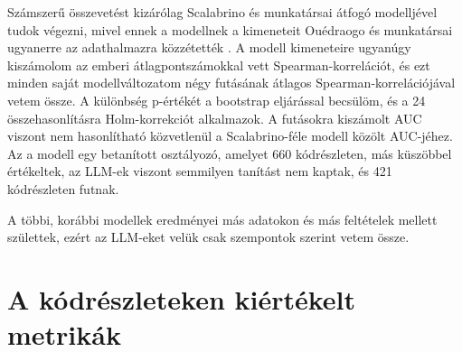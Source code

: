 \documentclass[
]{elteikthesis}[2024/04/26]
\begin{document}
Számszerű összevetést kizárólag Scalabrino és munkatársai átfogó modelljével
tudok végezni, %
mivel ennek a modellnek a kimeneteit Ouédraogo és munkatársai ugyanerre az
adathalmazra közzétették %
\cite{scalabrino2018comprehensive,ouedraogo2025coreeval}. %
A modell kimeneteire ugyanúgy kiszámolom az emberi átlagpontszámokkal vett
Spearman-korrelációt, és ezt minden saját modellváltozatom négy futásának
átlagos Spearman-korrelációjával vetem össze. A különbség p-értékét a bootstrap
eljárással becsülöm, és a 24 összehasonlításra Holm-korrekciót alkalmazok. A
futásokra kiszámolt AUC viszont nem hasonlítható közvetlenül a Scalabrino-féle
modell közölt AUC-jéhez. Az a modell egy betanított osztályozó, amelyet 660
kódrészleten, más küszöbbel értékeltek, az LLM-ek viszont semmilyen tanítást nem
kaptak, %
és 421 kódrészleten futnak. %

A többi, korábbi modellek eredményei más adatokon és más feltételek mellett
születtek, ezért az LLM-eket velük csak szempontok szerint vetem össze. %

\section{A kódrészleteken kiértékelt metrikák}
\label{sec:method:metrics}
\end{document}
